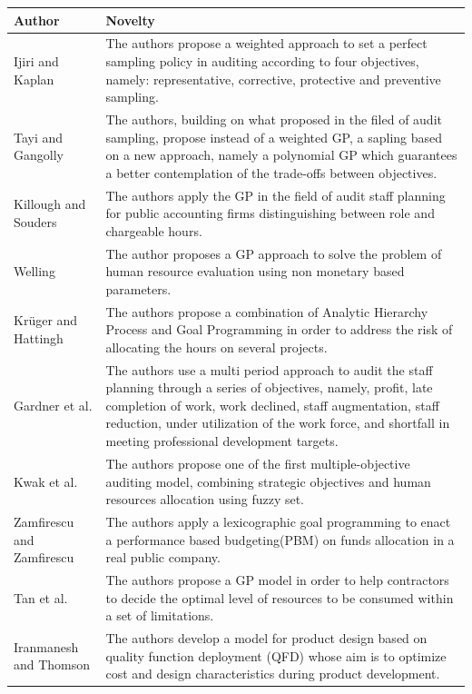 \documentclass{article}
\begin{document}
\begin{center}
\begin{tabular}{ || m{11em} m{20em}|| }
 \hline
 Author & Novelty \\ 
\hline\hline
Ijiri and Kaplan\cite{ijiriy._amodel_1971} & The authors propose a weighted approach to set a perfect sampling policy in auditing according to four objectives, namely: representative, corrective, protective and preventive sampling. \\
\hline
Tayi and Gangolly\cite{Tayi1985} & The authors, building on what proposed in the filed of audit sampling, propose instead of a weighted GP, a sapling based on a new approach, namely a polynomial GP which guarantees a better contemplation of the trade-offs between objectives. \\
\hline
Killough and Souders\cite{Killough1973} & The authors apply the GP in the field of audit staff planning for public accounting firms distinguishing between role and chargeable hours. \\
\hline
Welling\cite{Welling1977} & The author proposes a GP approach to solve the problem of human resource evaluation using non monetary based parameters. \\
\hline
Krüger and Hattingh\cite{Kruger2006} & The authors propose a combination of Analytic Hierarchy Process and Goal Programming in order to address the risk of allocating the hours on several projects. \\
\hline
Gardner et al.\cite{Gardner1990} & The authors use a multi period approach to audit the staff planning through a series of objectives, namely, profit, late completion of work, work declined, staff augmentation, staff reduction, under utilization of the work force, and shortfall in meeting professional development targets. \\
\hline
Kwak et al.\cite{Kwak2003} & The authors propose one of the first multiple-objective auditing model, combining strategic objectives and human resources allocation using fuzzy set. \\
\hline
Zamfirescu and Zamfirescu\cite{Zamfirescu2013} & The authors apply a lexicographic goal programming to enact a performance based budgeting(PBM) on funds allocation in a real public company. \\
\w
Tan et al.\cite{Tan2008} & The authors propose a GP model in order to help contractors to decide the optimal level of resources to be consumed within a set of limitations.  \\
\hline 
Iranmanesh and Thomson\cite{Iranmanesh2008} & The authors develop a model for product design based
on quality function deployment (QFD) whose aim is to optimize cost and design characteristics during product
development. \\
 \hline\end{tabular}
\end{center}
\end{document}
